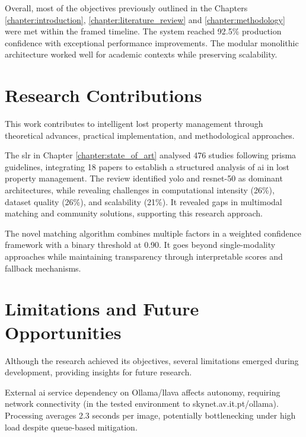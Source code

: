 Overall, most of the objectives previously outlined in the Chapters \ref{chapter:introduction}, \ref{chapter:literature_review} and \ref{chapter:methodology} were met within the framed timeline. The system reached 92.5\% production confidence with exceptional performance improvements. The modular monolithic architecture worked well for academic contexts while preserving scalability.


\section{Research Contributions} \label{section:research_contributions}

This work contributes to intelligent lost property management through theoretical advances, practical implementation, and methodological approaches.

The \ac{slr} in Chapter \ref{chapter:state_of_art} analysed 476 studies following \ac{prisma} guidelines, integrating 18 papers to establish a structured analysis of \ac{ai} in lost property management. The review identified \ac{yolo} and \ac{resnet}-50 as dominant architectures, while revealing challenges in computational intensity (26\%), dataset quality (26\%), and scalability (21\%). It revealed gaps in multimodal matching and community solutions, supporting this research approach.

The novel matching algorithm combines multiple factors in a weighted confidence framework with a binary threshold at 0.90. It goes beyond single-modality approaches while maintaining transparency through interpretable scores and fallback mechanisms.


\section{Limitations and Future Opportunities} \label{section:limitations_opportunities}

Although the research achieved its objectives, several limitations emerged during development, providing insights for future research.

External \ac{ai} service dependency on Ollama/\ac{llava} affects autonomy, requiring network connectivity (in the tested environment to skynet.av.it.pt/ollama). Processing averages 2.3 seconds per image, potentially bottlenecking under high load despite queue-based mitigation.

